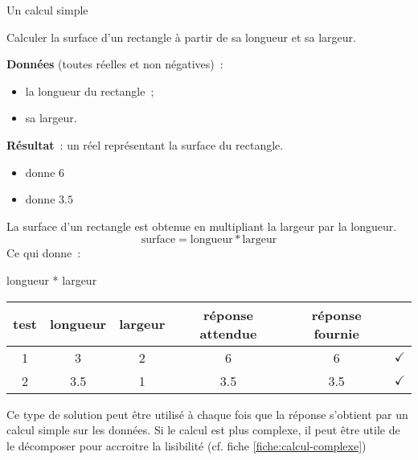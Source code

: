 \begin{Fiche}{Un calcul simple}
\label{fiche:calcul-simple}

Calculer la surface d’un rectangle à partir de sa longueur et sa largeur.
	

	\textbf{Données} (toutes réelles et non négatives)~:
		\begin{itemize}
			\item la longueur du rectangle~;
			\item sa largeur.
		\end{itemize}
		
	\textbf{Résultat}~: un réel représentant la surface du rectangle.

	\begin{center}	
	\end{center}


	\begin{itemize}
	\item {} donne $6$
	\item {} donne $3.5$
	\end{itemize}


	La surface d’un rectangle est obtenue en multipliant
	la largeur par la longueur.
	\[
		\textrm{surface} = \textrm{longueur} * \textrm{largeur}
	\]
	Ce qui donne~:

	\begin{LDA}
			\Return longueur * largeur
		\EndAlgo
	\end{LDA}


	\begin{center}
		\begin{tabular}{|c|cccc|c|}
		\hline
		test \no & longueur & largeur & réponse attendue & réponse fournie & {} \\\hline
		\hline 
		1 & 3   & 2 & 6   & 6   & {\color{ForestGreen}$\checkmark$} \\\hline
		2 & 3.5 & 1 & 3.5 & 3.5 & {\color{ForestGreen}$\checkmark$} \\\hline
		\end{tabular}
	\end{center}				


	Ce type de solution peut être utilisé à chaque fois
	que la réponse s’obtient par un calcul simple sur les données.
	Si le calcul est plus complexe, 
	il peut être utile de le décomposer pour accroitre la lisibilité
	(cf. fiche \vref{fiche:calcul-complexe}) 
	
\end{Fiche}

